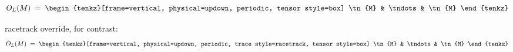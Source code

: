 \documentclass[varwidth=19cm, border=6pt]{standalone}
\begin{document}
\[
  O_L(M) \;=\;
  \begin{tenkz}[frame=vertical, physical=updown, periodic,
                tensor style=box]
    \tn{M} & \tndots & \tn{M}
  \end{tenkz}
\]

racetrack override, for contrast:
\[
  O_L(M) \;=\;
  \begin{tenkz}[frame=vertical, physical=updown,
                periodic, trace style=racetrack, tensor style=box]
    \tn{M} & \tndots & \tn{M}
  \end{tenkz}
\]
\end{document}
